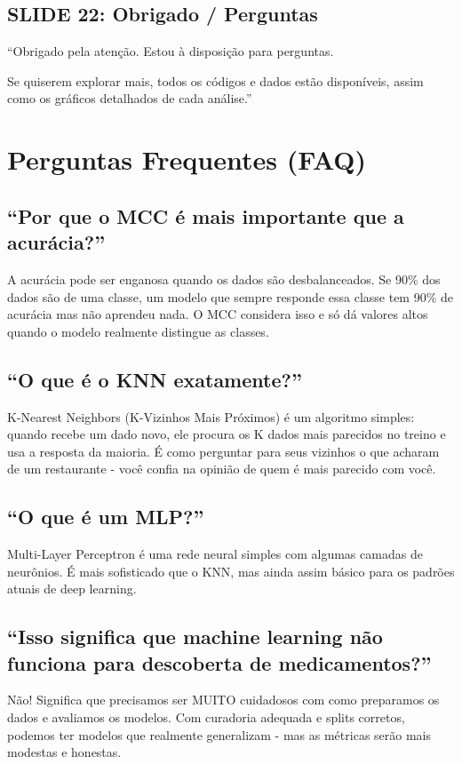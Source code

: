 \documentclass[11pt,a4paper]{article}
\begin{document}
\subsection{SLIDE 22: Obrigado / Perguntas}

\begin{oquedizer}
``Obrigado pela atenção. Estou à disposição para perguntas.

Se quiserem explorar mais, todos os códigos e dados estão disponíveis, assim como os gráficos detalhados de cada análise.''
\end{oquedizer}

\section{Perguntas Frequentes (FAQ)}

\subsection{``Por que o MCC é mais importante que a acurácia?''}
A acurácia pode ser enganosa quando os dados são desbalanceados. Se 90\% dos dados são de uma classe, um modelo que sempre responde essa classe tem 90\% de acurácia mas não aprendeu nada. O MCC considera isso e só dá valores altos quando o modelo realmente distingue as classes.

\subsection{``O que é o KNN exatamente?''}
K-Nearest Neighbors (K-Vizinhos Mais Próximos) é um algoritmo simples: quando recebe um dado novo, ele procura os K dados mais parecidos no treino e usa a resposta da maioria. É como perguntar para seus vizinhos o que acharam de um restaurante - você confia na opinião de quem é mais parecido com você.

\subsection{``O que é um MLP?''}
Multi-Layer Perceptron é uma rede neural simples com algumas camadas de neurônios. É mais sofisticado que o KNN, mas ainda assim básico para os padrões atuais de deep learning.

\subsection{``Isso significa que machine learning não funciona para descoberta de medicamentos?''}
Não! Significa que precisamos ser MUITO cuidadosos com como preparamos os dados e avaliamos os modelos. Com curadoria adequada e splits corretos, podemos ter modelos que realmente generalizam - mas as métricas serão mais modestas e honestas.
\end{document}
